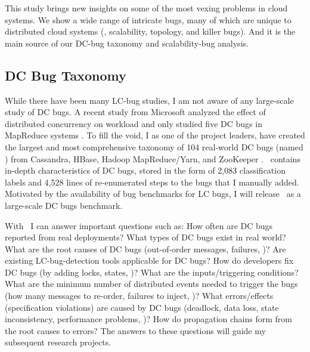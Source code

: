 This study brings new insights on some of the most vexing problems in cloud
systems. We show a wide range of intricate bugs, many of which are unique to
distributed cloud systems (\eg, scalability, topology, and killer bugs). And it
is the main source of our DC-bug taxonomy and scalability-bug analysis.

\subsection{DC Bug Taxonomy} 

While there have been many LC-bug studies, I am not aware of any large-scale
study of DC bugs. A recent study from Microsoft analyzed the effect of
distributed concurrency on workload and only studied five DC bugs in MapReduce
systems \cite{Xiao+14-NonDetMR}. To fill the void, I as one of the project
leaders, have created the largest and most comprehensive taxonomy of 104
real-world DC bugs (named \taxdc) from Cassandra, HBase, Hadoop MapReduce/Yarn,
and ZooKeeper \cite{Leesatapornwongsa+16-TaxDC}. \taxdc\ contains in-depth
characteristics of DC bugs, stored in the form of 2,083 classification labels
and 4,528 lines of re-enumerated steps to the bugs that I manually added.
Motivated by the availability of bug benchmarks for LC bugs, I will release
\taxdc\ as a large-scale DC bugs benchmark.

With \taxdc\, I can answer important questions such as: How often are DC bugs
reported from real deployments? What types of DC bugs exist in real world?
What are the root causes of DC bugs (out-of-order messages, failures, \etc)?
Are existing LC-bug-detection tools applicable for DC bugs? How do developers
fix DC bugs (by adding locks, states, \etc)? What are the inputs/triggering
conditions?  What are the minimum number of distributed events needed to
trigger the bugs (how many messages to re-order, failures to inject, \etc)?
What errors/effects (specification violations) are caused by DC bugs (deadlock,
data loss, state inconsistency, performance problems, \etc)? How do propagation
chains form from the root causes to errors? The answers to these questions will
guide my subsequent research projects.

